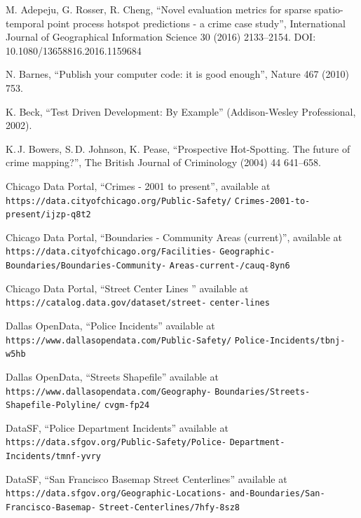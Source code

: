 \documentclass[twoside,a4paper,twocolumn,10pt]{article}
\theoremstyle{plain}
\theoremstyle{definition}
\begin{document}
\begin{thebibliography}{99}

 M. Adepeju, G. Rosser, R. Cheng,
   ``Novel evaluation metrics for sparse spatio-temporal point process hotspot predictions - a crime case study'',
   International Journal of Geographical Information Science 30 (2016) 2133--2154.
   DOI: 10.1080/13658816.2016.1159684

 N. Barnes, ``Publish your computer code: it is good enough'',
  Nature 467 (2010) 753.

 K. Beck, ``Test Driven Development: By Example''
  (Addison-Wesley Professional, 2002).

 K.\,J. Bowers, S.\,D. Johnson, K. Pease,
	``Prospective Hot-Spotting.  The future of crime mapping?'',
	The British Journal of Criminology (2004) 44 641--658.

 Chicago Data Portal, ``Crimes - 2001 to present'', available at
   {\small
   \texttt{https://data.cityofchicago.org/Public-Safety/} \texttt{Crimes-2001-to-present/ijzp-q8t2}}

 Chicago Data Portal, ``Boundaries - Community Areas (current)'', available at
   {\small\texttt{https://data.cityofchicago.org/Facilities-}
   \texttt{Geographic-Boundaries/Boundaries-Community-}
   \texttt{Areas-current-/cauq-8yn6}}

 Chicago Data Portal, ``Street Center Lines '' available at
   {\small
    \texttt{https://catalog.data.gov/dataset/street-}
   \texttt{center-lines}}

 Dallas OpenData, ``Police Incidents'' available at
   {\small
    \texttt{https://www.dallasopendata.com/Public-Safety/}
   \texttt{Police-Incidents/tbnj-w5hb}}

 Dallas OpenData, ``Streets Shapefile'' available at
   {\small
    \texttt{https://www.dallasopendata.com/Geography-}
   \texttt{Boundaries/Streets-Shapefile-Polyline/}
   \texttt{cvgm-fp24}}

 DataSF, ``Police Department Incidents'' available at
   {\small
    \texttt{https://data.sfgov.org/Public-Safety/Police-}
   \texttt{Department-Incidents/tmnf-yvry}}

 DataSF, ``San Francisco Basemap Street Centerlines'' available at
   {\small
    \texttt{https://data.sfgov.org/Geographic-Locations-}
   \texttt{and-Boundaries/San-Francisco-Basemap-}
   \texttt{Street-Centerlines/7hfy-8sz8}}


\end{thebibliography}
\end{document}
